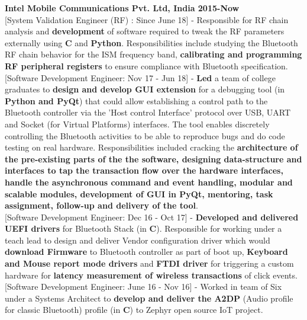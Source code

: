 
\vspace{-2cm} \reversemarginpar {}
\noindent \textbf{\textcolor{ultramarine}{Intel Mobile Communications Pvt. Ltd, India \hfill 2015-Now}
}\\
\textcolor{ultramarine}{[System Validation Engineer (RF) : Since June 18]} - Responsible for RF chain analysis and \textbf{development} of software required to tweak the RF parameters externally using \textbf{C} and \textbf{Python}. Responsibilities include studying the Bluetooth RF chain behavior for the ISM frequency band, \textbf{calibrating and programming RF peripheral registers} to ensure compliance with Bluetooth specification.\\

\noindent \textcolor{ultramarine}{[Software Development Engineer: Nov 17 - Jun 18]} - \textbf{Led} a team of college graduates to \textbf{design and develop GUI extension} for a debugging tool (in \textbf{Python and PyQt}) that could allow establishing a control path to the Bluetooth controller via the 'Host control Interface' protocol over USB, UART and Socket (for Virtual Platforms) interfaces. The tool enables discretely controlling the Bluetooth activities to be able to reproduce bugs and do code testing on real hardware. Responsibilities included cracking the \textbf{architecture of the pre-existing parts of the the software, designing data-structure and interfaces to tap the transaction flow over the hardware interfaces, handle the asynchronous command and event handling, modular and scalable modules, development of GUI in PyQt, mentoring, task assignment, follow-up and delivery of the tool}. \\

\noindent \textcolor{ultramarine}{[Software Development Engineer: Dec 16 - Oct 17]} - \textbf{Developed and delivered UEFI drivers} for Bluetooth Stack (in \textbf{C}). Responsible for working under a teach lead to design and deliver Vendor configuration driver which would \textbf{download Firmware} to Bluetooth controller as part of boot up, \textbf{Keyboard and Mouse report mode drivers} and \textbf{FTDI driver} for triggering a custom hardware for \textbf{latency measurement of wireless transactions} of click events.\\

\noindent \textcolor{ultramarine}{[Software Development Engineer: June 16 - Nov 16]} - Worked in team of Six under a Systems Architect to \textbf{develop and deliver the A2DP} (Audio profile for classic Bluetooth) profile (in \textbf{C}) to Zephyr open source IoT project. \\


